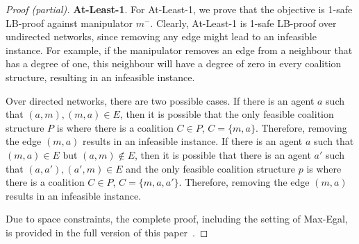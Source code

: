 \documentclass{article}
\begin{document}
\begin{proof}[Proof (partial)]
\textbf{At-Least-1}.
For At-Least-1, we prove that the objective is 1-safe LB-proof against manipulator $m^-$. Clearly, At-Least-1 is 1-safe LB-proof over undirected networks, since removing any edge might lead to an infeasible instance. For example, if the manipulator removes an edge from a neighbour that has a degree of one, this neighbour will have a degree of zero in every coalition structure, resulting in an infeasible instance.

Over directed networks, there are two possible cases. If there is an agent $a$ such that $(a,m), (m,a) \in E$, then it is possible that the only feasible coalition structure $P$ is where there is a coalition $C \in P$, $C = \{m,a\}$. Therefore, removing the edge $(m,a)$ results in an infeasible instance. If there is an agent $a$ such that $(m,a) \in E$ but $(a,m) \notin E$, then it is possible that there is an agent $a'$ such that $(a,a'), (a',m) \in E$ and the only feasible coalition structure $p$ is where there is a coalition  $C \in P$, $C = \{m,a,a'\}$. Therefore, removing the edge $(m,a)$ results in an infeasible instance.

Due to space constraints, the complete proof, including the setting of Max-Egal, is provided in the full version of this paper~\cite{waxman2021manipulation}. 
\end{proof}
\end{document}
